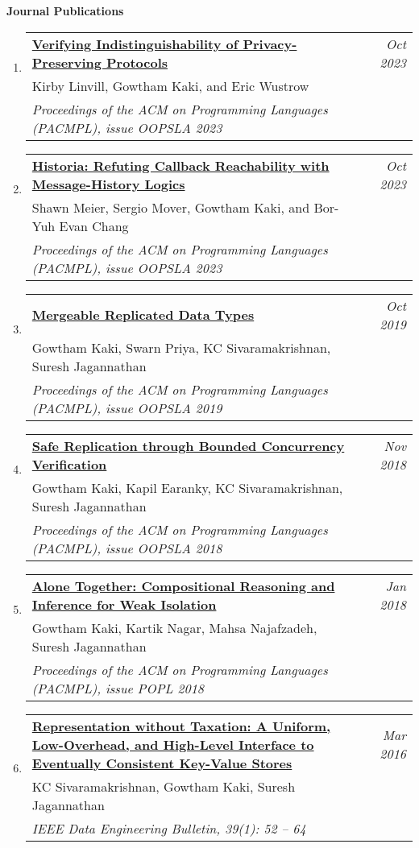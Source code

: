 \documentclass[10pt]{article}
\makeatletter
\newcommand{\lbar}[1]{{\color{#1}\ding{118}}\hspace*{2pt}}
\newenvironment{benumerate}[2]{
    \let\oldItem\item
    \def\item{\addtocounter{enumi}{-2}\oldItem}
    \begin{enumerate}[#2] \itemsep3pt
    \setcounter{enumi}{#1}
    \addtocounter{enumi}{1}} 
  {\end{enumerate}}
\newenvironment{publication}[5]
{ \item
  \begin{tabular*}{7.5in}{p{6.3in}@{\extracolsep{\fill}}r}
    \href{#1}{\textbf{#2}} & \textit{#3}\\ #4 &\\ \textit{#5}&\\
  \end{tabular*}
} {}
\newenvironment{region}[3]{%
  \vspace*{0.5ex}
  {{\textbf{\large{#1}}}}
  \begin{benumerate}{#3}{\color{RoyalBlue}#2}}
  {\end{benumerate}\vspace{0.8ex}}
\makeatother
\begin{document}
\begin{region} {\lbar{Mahogany}Journal Publications}{{J}1}{4}

  \begin{publication}{https://gowthamk.github.io/docs/oopsla23a.pdf}
		{Verifying Indistinguishability of Privacy-Preserving Protocols }
    {Oct 2023}{Kirby Linvill, Gowtham Kaki, and Eric Wustrow}
		{Proceedings of the ACM on Programming Languages (PACMPL), issue OOPSLA 2023}
  \end{publication}

  \begin{publication}{https://gowthamk.github.io/docs/oopsla23b.pdf}
		{Historia: Refuting Callback Reachability with Message-History Logics}
    {Oct 2023}{Shawn Meier, Sergio Mover, Gowtham Kaki, and Bor-Yuh Evan Chang}
		{Proceedings of the ACM on Programming Languages (PACMPL), issue OOPSLA 2023}
  \end{publication}

	\begin{publication}{https://gowthamk.github.io/docs/mrdt.pdf}
		{Mergeable Replicated Data Types}
    {Oct 2019}{Gowtham Kaki, Swarn Priya, KC Sivaramakrishnan, Suresh Jagannathan}
		{Proceedings of the ACM on Programming Languages (PACMPL), issue OOPSLA 2019}
  \end{publication}

	\begin{publication}{https://gowthamk.github.io/docs/q9.pdf}
		{Safe Replication through Bounded Concurrency Verification}
    {Nov 2018}{Gowtham Kaki, Kapil Earanky, KC Sivaramakrishnan, Suresh Jagannathan}
		{Proceedings of the ACM on Programming Languages (PACMPL), issue OOPSLA 2018}
  \end{publication}

  \begin{publication}{https://gowthamk.github.io/docs/popl18.pdf}
    {Alone Together: Compositional Reasoning and Inference for Weak Isolation}
    {Jan 2018}
    {Gowtham Kaki, Kartik Nagar, Mahsa Najafzadeh, Suresh Jagannathan}
    {Proceedings of the ACM on Programming Languages (PACMPL), issue POPL 2018}
  \end{publication}

  \begin{publication}{https://gowthamk.github.io/docs/quelea_ieee16.pdf}
    {Representation without Taxation: A Uniform, Low-Overhead, and High-Level Interface to Eventually Consistent Key-Value Stores}
    {Mar 2016}{KC Sivaramakrishnan, Gowtham Kaki, Suresh Jagannathan}
    {IEEE Data Engineering Bulletin, 39(1): 52 -- 64}
  \end{publication}
\end{region}
\end{document}
